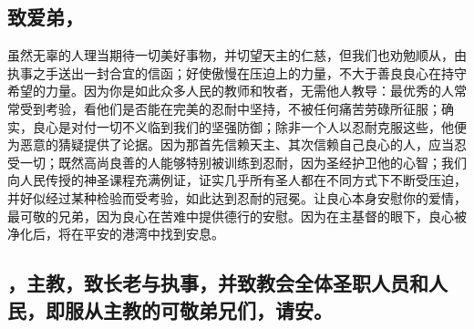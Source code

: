 
\subsection{致爱弟，}

虽然无辜的人理当期待一切美好事物，并切望天主的仁慈，但我们也劝勉顺从，由执事之手送出一封合宜的信函；好使傲慢在压迫上的力量，不大于善良良心在持守希望的力量。因为你是如此众多人民的教师和牧者，无需他人教导：最优秀的人常常受到考验，看他们是否能在完美的忍耐中坚持，不被任何痛苦劳碌所征服；确实，良心是对付一切不义临到我们的坚强防御；除非一个人以忍耐克服这些，他便为恶意的猜疑提供了论据。因为那首先信赖天主、其次信赖自己良心的人，应当忍受一切；既然高尚良善的人能够特别被训练到忍耐，因为圣经护卫他的心智；我们向人民传授的神圣课程充满例证，证实几乎所有圣人都在不同方式下不断受压迫，并好似经过某种检验而受考验，如此达到忍耐的冠冕。让良心本身安慰你的爱情，最可敬的兄弟，因为良心在苦难中提供德行的安慰。因为在主基督的眼下，良心被净化后，将在平安的港湾中找到安息。\par


\subsection{，主教，致长老与执事，并致教会全体圣职人员和人民，即服从主教的可敬弟兄们，请安。}

